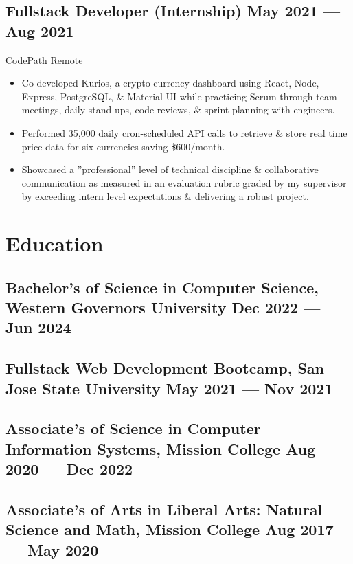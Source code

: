 \documentclass[a4,10pt]{article}
\newcommand{\subtext}[1]{
#1\par\vspace{-0.2cm}}
\newenvironment{zitemize}{
\begin{itemize}\itemsep0pt \parskip0pt \parsep1pt}
{\end{itemize}\vspace{-0.5cm}}
\begin{document}

\subsection*{Fullstack Developer {\normalsize \normalfont(Internship) } \hfill  May 2021 --- Aug 2021 }
\subtext{CodePath \hfill Remote } 
    \begin{zitemize}
        \item Co-developed Kurios, a crypto currency dashboard using React, Node, Express, PostgreSQL, \& Material-UI while practicing Scrum through team meetings, daily stand-ups, code reviews, \& sprint planning with engineers.
        \item Performed 35,000 daily cron-scheduled API calls to retrieve \& store real time price data for six currencies saving \$600/month.
        \item Showcased a ”professional” level of technical discipline \& collaborative communication as measured in an evaluation rubric graded by my supervisor by exceeding intern level expectations \& delivering a robust project.
    \end{zitemize}





\section{Education}
\subsection*{Bachelor's of Science in Computer Science, {\normalsize \normalfont Western Governors University} \hfill Dec 2022 --- Jun 2024} 
\vspace{0.2cm}
\subsection*{Fullstack Web Development Bootcamp, {\normalsize \normalfont San Jose State University} \hfill May 2021 --- Nov 2021} 
\vspace{0.2cm}
\subsection*{Associate's of Science in Computer Information Systems, {\normalsize \normalfont Mission College} \hfill Aug 2020 --- Dec 2022} 
\vspace{0.2cm}
\subsection*{Associate's of Arts in Liberal Arts: Natural Science and Math, {\normalsize \normalfont Mission College} \hfill Aug 2017 --- May 2020} 
{\hfill}


\end{document}
